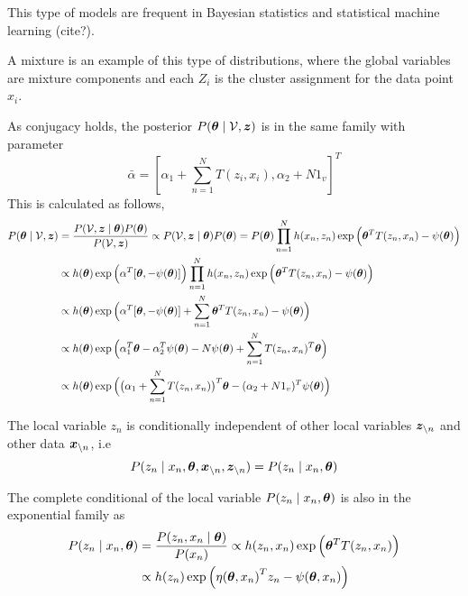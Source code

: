 This type of models are frequent in Bayesian statistics and statistical machine learning (cite?).

\begin{remark}
  A mixture is an example of this type of distributions, where the global variables are mixture components and each \(Z_{i}\) is the cluster assignment for the data point \(x_{i}\).
\end{remark}

As conjugacy holds, the posterior \(P(\bm{\theta} \mid \mathcal{V}, \bm{z})\) is in the same family with parameter
\[
  \bar{\alpha} = [\alpha_{1} + \sum_{n=1}^{N} T(z_{i}, x_{i}), \alpha_{2}+ N1_{v}]^{T}
\]
This is calculated as follows,
\[
  \begin{aligned}
    P(\bm{\theta} \mid \mathcal{V}, \bm{z}) &= \frac{P(\mathcal{V}, \bm{z} \mid \bm{\theta}) P(\bm{\theta})}{P(\mathcal{V}, \bm{z})} \propto  P(\mathcal{V}, \bm{z} \mid \bm{\theta}) P(\bm{\theta}) = P(\bm{\theta}) \prod_{n=1}^{N}h(x_{n}, z_{n})\exp \Big( \bm{\theta}^{T}T(z_{n}, x_{n})  - \psi(\bm{\theta}) \Big)\\
    &\propto  h(\bm{\theta}) \exp \Big( \alpha^{T}[\bm{\theta}, -\psi(\bm{\theta})]\Big)  \prod_{n=1}^{N}h(x_{n}, z_{n})\exp \Big( \bm{\theta}^{T}T(z_{n}, x_{n})  - \psi(\bm{\theta}) \Big)\\
    &\propto h(\bm{\theta}) \exp \Big(   \alpha^{T}[\bm{\theta}, -\psi(\bm{\theta})] + \sum_{n=1}^{N}  \bm{\theta}^{T}T(z_{n}, x_{n})  - \psi(\bm{\theta})  \Big)\\
    &\propto h(\bm{\theta}) \exp \Big(   \alpha_{1}^{T}\bm{\theta}  - \alpha_{2}^{T}\psi(\bm{\theta}) - N\psi(\bm{\theta}) + \sum_{n=1}^{N}  T(z_{n}, x_{n})^{T}\bm{\theta}  \Big)\\
    &\propto h(\bm{\theta}) \exp \Big(   \big(\alpha_{1} + \sum_{n=1}^{N}  T(z_{n}, x_{n})\big)^{T} \bm{\theta}  - (\alpha_{2} + N1_{v})^{T}\psi(\bm{\theta}) \Big)
  \end{aligned}
\]

The local variable \(z_{n}\) is conditionally independent of other local variables \(\bm{z}_{\backslash n}\)  and other data \(\bm{x}_{\backslash n}\), i.e
\[
  P(z_{n} \mid x_{n}, \bm{\theta}, \bm{x}_{\backslash n}, \bm{z}_{\backslash n}) = P(z_{n} \mid x_{n}, \bm{\theta})
\]

The complete conditional of the local variable \(P(z_{n} \mid x_{n}, \bm{\theta})\) is also in the exponential family as
\[
  \begin{aligned}
    P(z_{n}\mid x_{n} , \bm{\theta}) &= \frac{P(z_{n}, x_{n} \mid \bm{\theta})}{P(x_{n})} \propto  h(z_{n}, x_{n}) \exp \Big( \bm{\theta}^{T} T(z_{n}, x_{n})\Big)\\
    &\propto h(z_{n})\exp \Big( {\eta(\bm{\theta}, x_{n})}^{T}z_{n} - \psi(\bm{\theta}, x_{n}) \Big)
  \end{aligned}
\]

